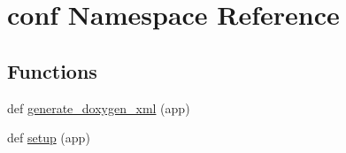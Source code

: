 \hypertarget{namespaceconf}{}\section{conf Namespace Reference}
\label{namespaceconf}
\subsection*{Functions}
\begin{DoxyCompactItemize}
\item 
def \mbox{\hyperlink{namespaceconf_a7d797ba34f8be1c89a804f65bc58235d}{generate\+\_\+doxygen\+\_\+xml}} (app)
\item 
def \mbox{\hyperlink{namespaceconf_ab10c3cab2b831ad54a5b330ce0f414e0}{setup}} (app)
\end{DoxyCompactItemize}
